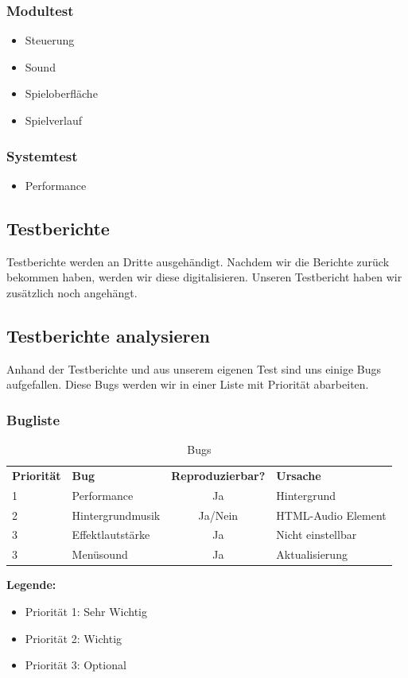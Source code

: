 \subsubsection{Modultest}
\begin{itemize}
	\item Steuerung
	\item Sound
	\item Spieloberfläche
	\item Spielverlauf
\end{itemize}
\subsubsection{Systemtest}
\begin{itemize}
	\item Performance
\end{itemize}
\subsection{Testberichte}
Testberichte werden an Dritte ausgehändigt. Nachdem wir die Berichte zurück bekommen haben, werden wir diese digitalisieren. 
Unseren Testbericht haben wir zusätzlich noch angehängt. 




\subsection{Testberichte analysieren}
Anhand der Testberichte und aus unserem eigenen Test sind uns einige Bugs aufgefallen. Diese Bugs werden wir in einer Liste mit Priorität abarbeiten.
\subsubsection{Bugliste}
\begin{table}[h]
	\centering
	\begin{tabular}{l|l|c|l}
		\textbf{Priorität}& \textbf{Bug} & \textbf{Reproduzierbar?} & \textbf{Ursache}\\
		1 & Performance & Ja & Hintergrund	\\ 
		2 & Hintergrundmusik & Ja/Nein & HTML-Audio Element\\
		3 & Effektlautstärke & Ja & Nicht einstellbar\\
		3 & Menüsound & Ja & Aktualisierung\\
	\end{tabular}
	\caption{Bugs}
\end{table}
\textbf{Legende:}
\begin{itemize}
	\item Priorität 1: Sehr Wichtig
	\item Priorität 2: Wichtig
	\item Priorität 3: Optional
\end{itemize}
